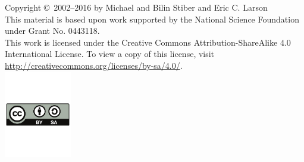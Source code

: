 \documentclass[12pt]{book}
\begin{document}
\begin{titlepage}
\newpage
\mbox{}\vspace{2in}
\begin{flushright}
Copyright \copyright\ 2002--2016 by Michael and Bilin Stiber and Eric
C. Larson\\[1in]
This material is based upon work supported by the National Science
Foundation under Grant No. 0443118.\\[2in]
This work is licensed under the Creative Commons
Attribution-ShareAlike 4.0 International License. To view a copy of
this license, visit
\url{http://creativecommons.org/licenses/by-sa/4.0/}.\\
\includegraphics[height=1.5in]{by-sa}
\end{flushright}

\thispagestyle{empty}

\end{titlepage}

\frontmatter

\tableofcontents
\listoffigures
\listoftables
\listofalgorithms
{}





\mainmatter











\appendix



\backmatter

\printindex
\end{document}
